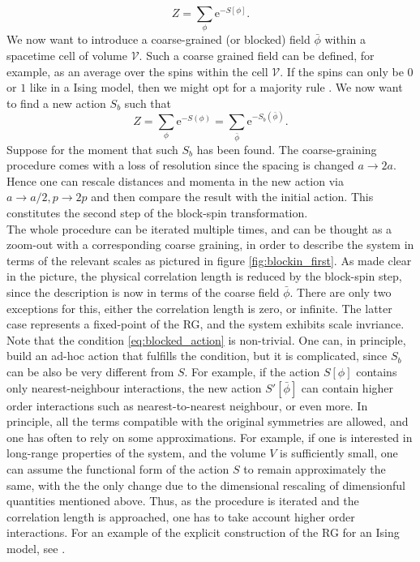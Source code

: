 \begin{equation*}
    Z=\sum_{\phi} \mathrm{e}^{-S[\phi]}.
\end{equation*}
We now want to introduce a coarse-grained (or blocked) field $\bar\phi$ within a spacetime cell of volume $\mathcal{V}$. Such a coarse grained field can be defined, for example, as an average over the spins within the cell $\mathcal{V}$. If the spins can only be $0$ or $1$ like in a Ising model, then we might opt for a majority rule \cite{cardy_1996}.
We now want to find a new action $S_b$ such that 
\begin{equation}
    Z=\sum_{\phi} \mathrm{e}^{-S(\phi)}= \sum_{\bar\phi} \mathrm{e}^{-S_b\left(\bar\phi\right)}.
    \label{eq:blocked_action}
\end{equation}
Suppose for the moment that such $S_b$ has been found. The coarse-graining procedure comes with a loss of resolution since the spacing is changed $a \to 2a$. Hence one can rescale distances and momenta in the new action via $a \to a/2, p \to 2p$ and then compare the result with the initial action. This constitutes the second step of the block-spin transformation. \\
The whole procedure can be iterated multiple times, and can be thought as a zoom-out with a corresponding coarse graining, in order to describe the system in terms of the relevant scales as pictured in figure \ref{fig:blockin_first}. As made clear in the picture, the physical correlation length is reduced by the block-spin step, since the description is now in terms of the coarse field $\bar\phi$. 
There are only two exceptions for this, either the correlation length is zero, or infinite. The latter case represents a fixed-point of the RG, and the system exhibits scale invriance. \\
Note that the condition \eqref{eq:blocked_action} is non-trivial. One can, in principle, build an ad-hoc action that fulfills the condition, but it is complicated, since $S_b$ can be also be very different from $S$. For example, if the action $S[\phi]$ contains only nearest-neighbour interactions, the new action $S'[\bar\phi]$ can contain higher order interactions such as nearest-to-nearest neighbour, or even more.  In principle, all the terms compatible with the original symmetries are allowed, and one has often to rely on some approximations. For example, if one is interested in long-range properties of the system, and the volume $V$ is sufficiently small, one can assume 
the functional form of the action $S$ to remain approximately the same, with the the only change due to the dimensional rescaling of dimensionful quantities mentioned above. Thus, as the procedure is iterated and the correlation length is approached, one has to take account higher order interactions. For an example of the explicit construction of the RG for an Ising model, see \cite{cardy_1996}.

